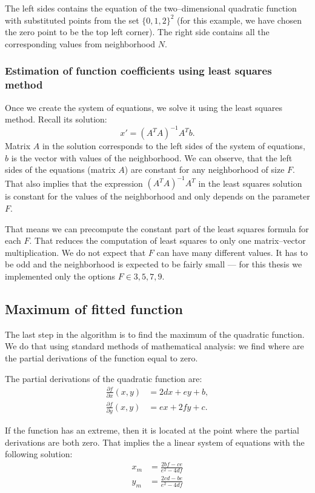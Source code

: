 The left sides contains the equation of the two--dimensional quadratic function with substituted points from the set $\{0,1,2\}^2$ (for this example, we have chosen the zero point to be the top left corner). The right side contains all the corresponding values from neighborhood $N$.

\subsubsection{Estimation of function coefficients using least squares method}
\label{estimation}

Once we create the system of equations, we solve it using the least squares method. Recall its solution:
\[
x' = (A^TA)^{-1}A^Tb.
\]
Matrix $A$ in the solution corresponds to the left sides of the system of equations, $b$ is the vector with values of the neighborhood. We can observe, that the left sides of the equations (matrix $A$) are constant for any neighborhood of size $F$. That also implies that the expression $(A^TA)^{-1}A^T$ in the least squares solution is constant for the values of the neighborhood and only depends on the parameter $F$.

That means we can precompute the constant part of the least squares formula for each $F$. That reduces the computation of least squares to only one matrix--vector multiplication. We do not expect that $F$ can have many different values. It has to be odd and the neighborhood is expected to be fairly small --- for this thesis we implemented only the options $F \in {3, 5, 7, 9}$.


\subsection{Maximum of fitted function}

The last step in the algorithm is to find the maximum of the quadratic function. We do that using standard methods of mathematical analysis: we find where are the partial derivations of the function equal to zero.

The partial derivations of the quadratic function are:
\begin{align*}
\frac{\partial f}{\partial x}(x,y) &= 2dx + ey + b,\\
\frac{\partial f}{\partial y}(x,y) &= ex + 2fy + c.
\end{align*}

If the function has an extreme, then it is located at the point where the partial derivations are both zero. That implies the a linear system of equations with the following solution:
\begin{align*}
x_m &= \frac{2bf - ce}{e^2 - 4df}\\
y_m &= \frac{2cd - be}{e^2 - 4df}
\end{align*}

